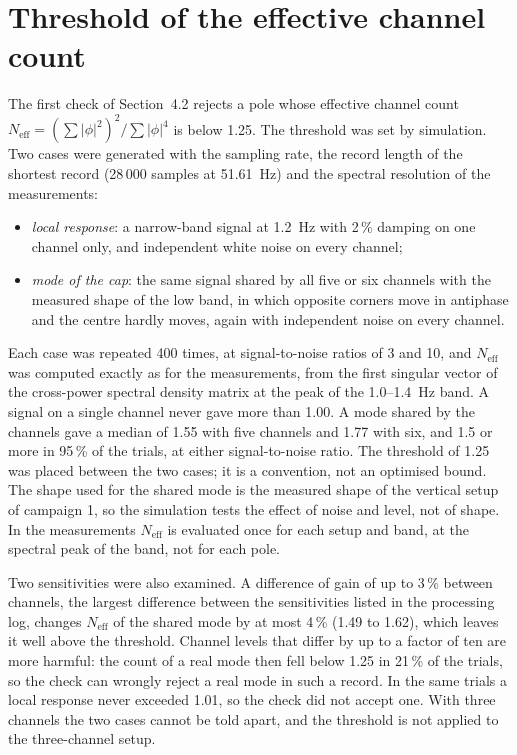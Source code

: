 \documentclass[11pt]{article}
\begin{document}
\section{Threshold of the effective channel count}
\label{sec:s-neff}

The first check of Section~4.2 rejects a pole whose effective channel count
$N_{\mathrm{eff}} = (\sum|\phi|^2)^2 / \sum|\phi|^4$ is below 1.25. The
threshold was set by simulation. Two cases were generated with the sampling
rate, the record length of the shortest record (28\,000 samples at 51.61~Hz)
and the spectral resolution of the measurements:

\begin{itemize}
\item \emph{local response}: a narrow-band signal at 1.2~Hz with 2\,\% damping
on one channel only, and independent white noise on every channel;
\item \emph{mode of the cap}: the same signal shared by all five or six
channels with the measured shape of the low band, in which opposite corners
move in antiphase and the centre hardly moves, again with independent noise
on every channel.
\end{itemize}

Each case was repeated 400 times, at signal-to-noise ratios of 3 and 10, and
$N_{\mathrm{eff}}$ was computed exactly as for the measurements, from the first
singular vector of the cross-power spectral density matrix at the peak of the
1.0--1.4~Hz band. A signal on a single channel never gave more than 1.00. A
mode shared by the channels gave a median of 1.55 with five channels and 1.77
with six, and 1.5 or more in 95\,\% of the trials, at either signal-to-noise
ratio. The threshold of 1.25 was placed between the two cases; it is a convention, not an optimised bound. The shape used for the shared mode is the measured shape of the vertical setup of campaign 1, so the simulation tests the effect of noise and level, not of shape. In the measurements $N_{\mathrm{eff}}$ is evaluated once for each setup and band, at the spectral peak of the band, not for each pole.

Two sensitivities were also examined. A difference of gain of up to 3\,\%
between channels, the largest difference between the sensitivities listed in
the processing log, changes $N_{\mathrm{eff}}$ of the shared mode by at most
4\,\% (1.49 to 1.62), which leaves it well above the threshold. Channel levels
that differ by up to a factor of ten are more harmful: the
count of a real mode then fell below 1.25 in 21\,\% of the trials, so the
check can wrongly reject a real mode in such a record. In the same trials a
local response never exceeded 1.01, so the check did not accept one. With three
channels the two cases cannot be told apart, and the threshold is not applied
to the three-channel setup.
\end{document}
